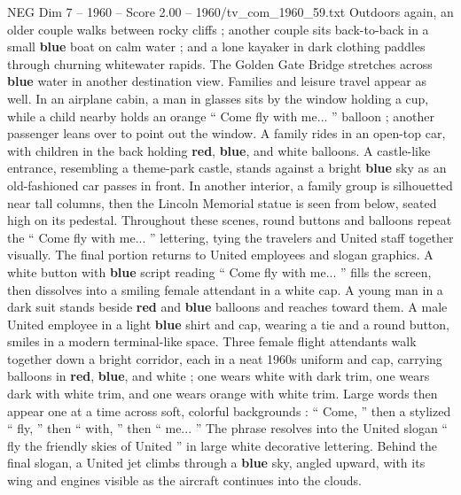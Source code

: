 \begin{textsample}{NEG Dim 7 – 1960 – Score 2.00 – 1960/tv\_com\_1960\_59.txt}
Outdoors again, an older couple walks between rocky cliffs ; another couple sits back-to-back in a small \textbf{blue} boat on calm water ; and a lone kayaker in dark clothing paddles through churning whitewater rapids.
The Golden Gate Bridge stretches across \textbf{blue} water in another destination view.
Families and leisure travel appear as well.
In an airplane cabin, a man in glasses sits by the window holding a cup, while a child nearby holds an orange “ Come fly with me... ” balloon ; another passenger leans over to point out the window.
A family rides in an open-top car, with children in the back holding \textbf{red}, \textbf{blue}, and white balloons.
A castle-like entrance, resembling a theme-park castle, stands against a bright \textbf{blue} sky as an old-fashioned car passes in front.
In another interior, a family group is silhouetted near tall columns, then the Lincoln Memorial statue is seen from below, seated high on its pedestal.
Throughout these scenes, round buttons and balloons repeat the “ Come fly with me... ” lettering, tying the travelers and United staff together visually.
The final portion returns to United employees and slogan graphics.
A white button with \textbf{blue} script reading “ Come fly with me... ” fills the screen, then dissolves into a smiling female attendant in a white cap.
A young man in a dark suit stands beside \textbf{red} and \textbf{blue} balloons and reaches toward them.
A male United employee in a light \textbf{blue} shirt and cap, wearing a tie and a round button, smiles in a modern terminal-like space.
Three female flight attendants walk together down a bright corridor, each in a neat 1960s uniform and cap, carrying balloons in \textbf{red}, \textbf{blue}, and white ; one wears white with dark trim, one wears dark with white trim, and one wears orange with white trim.
Large words then appear one at a time across soft, colorful backgrounds : “ Come, ” then a stylized “ fly, ” then “ with, ” then “ me... ” The phrase resolves into the United slogan “ fly the friendly skies of United ” in large white decorative lettering.
Behind the final slogan, a United jet climbs through a \textbf{blue} sky, angled upward, with its wing and engines visible as the aircraft continues into the clouds.

\end{textsample}
